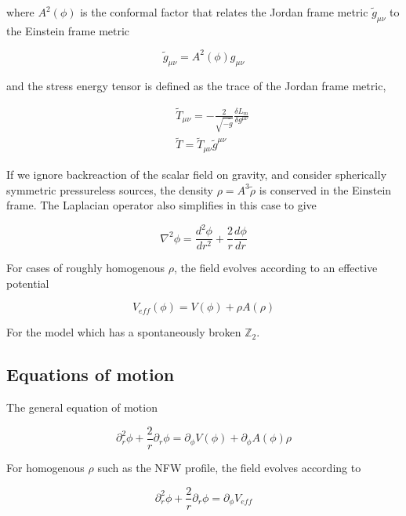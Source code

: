 \documentclass[aps,showpacs,onecolumn,floats,prd,superscriptaddress,nofootinbib]{revtex4-1}
\begin{document}
where $A^2(\phi)$ is the conformal factor that relates the Jordan frame metric $\tilde{g}_{\mu\nu}$ to the Einstein frame metric

\begin{equation}
	\tilde{g}_{\mu \nu}=A^2(\phi)g_{\mu \nu}
\end{equation}

and the stress energy tensor is defined as the trace of the Jordan frame metric, 

\begin{eqnarray}
	& & \tilde{T}_{\mu \nu} =- \frac{2}{\sqrt{-\tilde{g}}} \frac{\delta L_m}{\delta g^{\mu \nu}}	\nonumber	\\
	& & \tilde{T} = \tilde{T}_{\mu \nu} \tilde{g}^{\mu \nu}
\end{eqnarray}

If we ignore backreaction of the scalar field on gravity, and consider spherically symmetric pressureless sources, the density $\rho = A^3\tilde{\rho}$ is conserved in the Einstein frame. The Laplacian operator also simplifies in this case to give 

\begin{equation}
	\nabla^2 \phi = \frac{d^2 \phi}{dr^2} + \frac{2}{r} \frac{d \phi}{dr}
\end{equation}

For cases of roughly homogenous $\rho$, the field evolves according to an effective potential 

\begin{equation}
	V_{eff}(\phi) = V(\phi) + \rho A(\rho)
\end{equation}

For the model which has a spontaneously broken $\mathbb{Z}_2$.

\subsection{Equations of motion}

The general equation of motion 

\begin{equation}
	\partial_r^2 \phi + \frac{2}{r} \partial_r \phi = \partial_\phi V(\phi) + \partial_\phi A(\phi) \rho
\end{equation}

For homogenous $\rho$ such as the NFW profile, the field evolves according to 

\begin{equation}
	\partial_r^2 \phi + \frac{2}{r} \partial_r \phi = \partial_\phi V_{eff}
\end{equation}
\end{document}
